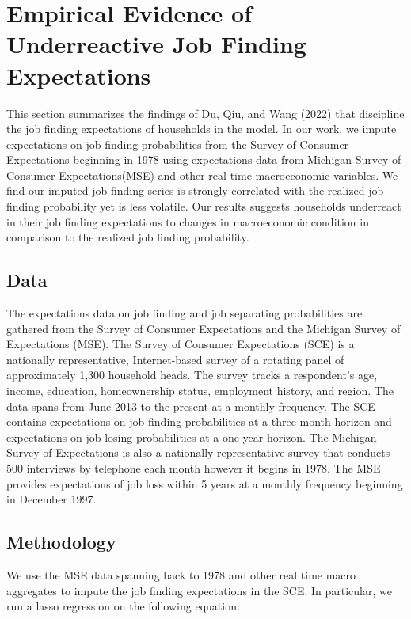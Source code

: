 \documentclass[titlepage]{\econtex}\providecommand{\texname}{Dissertation-Proposal}
\begin{document}
\hypertarget{Empirical Evidence of Underreactive Job Finding Expectations}{}
\section{Empirical Evidence of Underreactive Job Finding Expectations}

This section summarizes the findings of Du, Qiu, and Wang (2022) that discipline the job finding expectations of households in the model. In our work, we impute expectations on job finding probabilities from the Survey of Consumer Expectations beginning in 1978 using expectations data from Michigan Survey of Consumer Expectations(MSE) and other real time macroeconomic variables. We find our imputed job finding series is strongly correlated with the realized job finding probability yet is less volatile. Our results suggests households underreact in their job finding expectations to changes in macroeconomic condition in comparison to the realized job finding probability.


\subsection{Data}
\label{subsec:Data}

The expectations data on job finding and job separating probabilities are gathered from the Survey of Consumer Expectations and the Michigan Survey of Expectations (MSE). The Survey of Consumer Expectations (SCE) is a nationally representative, Internet-based survey of a rotating panel of approximately 1,300 household heads. The survey tracks a respondent's age, income, education, homeownership status, employment history, and region. The data spans from June 2013 to the present at a monthly frequency. The SCE contains expectations on job finding probabilities at a three month horizon and expectations on job losing probabilities at a one year horizon.  The Michigan Survey of Expectations is also a nationally representative survey that conducts 500 interviews by telephone each month however it begins in 1978.   The MSE provides expectations of job loss within 5 years at a monthly frequency beginning in December 1997. \\

\subsection{Methodology}
\label{subsec:Methodology}


We use the MSE data spanning back to 1978 and other real time macro aggregates to impute the job finding expectations in the SCE. In particular, we run a lasso regression on the following equation:
\end{document}
